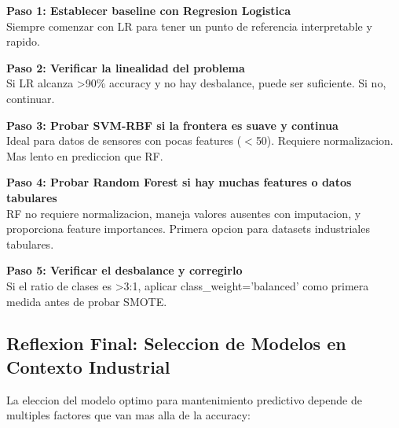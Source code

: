 \documentclass[12pt,a4paper]{article}
\begin{document}
\begin{tcolorbox}[porquebox, title={Guia practica de seleccion de algoritmos}]
\textbf{Paso 1: Establecer baseline con Regresion Logistica}\\
Siempre comenzar con LR para tener un punto de referencia interpretable y rapido.

\vspace{4pt}
\textbf{Paso 2: Verificar la linealidad del problema}\\
Si LR alcanza >90\% accuracy y no hay desbalance, puede ser suficiente. Si no, continuar.

\vspace{4pt}
\textbf{Paso 3: Probar SVM-RBF si la frontera es suave y continua}\\
Ideal para datos de sensores con pocas features ($<$50). Requiere normalizacion. Mas lento
en prediccion que RF.

\vspace{4pt}
\textbf{Paso 4: Probar Random Forest si hay muchas features o datos tabulares}\\
RF no requiere normalizacion, maneja valores ausentes con imputacion, y proporciona feature
importances. Primera opcion para datasets industriales tabulares.

\vspace{4pt}
\textbf{Paso 5: Verificar el desbalance y corregirlo}\\
Si el ratio de clases es >3:1, aplicar class\_weight='balanced' como primera medida antes de
probar SMOTE.
\end{tcolorbox}

\subsection{Reflexion Final: Seleccion de Modelos en Contexto Industrial}

La eleccion del modelo optimo para mantenimiento predictivo depende de multiples factores que
van mas alla de la accuracy:
\end{document}
